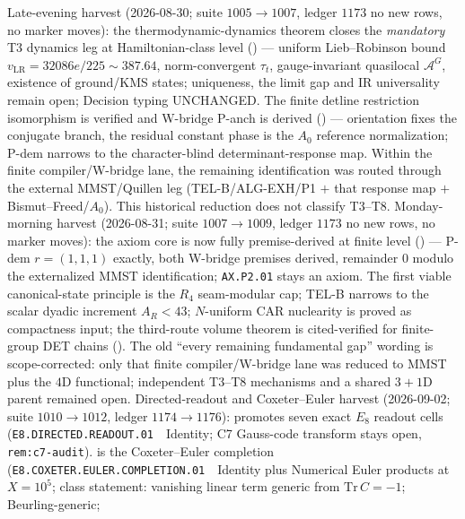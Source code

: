 \begin{keybox}
Late-evening harvest (2026-08-30; suite $1005\to1007$, ledger $1173$ no new rows, no marker moves):
the thermodynamic-dynamics theorem closes the \emph{mandatory} T3 dynamics leg at
Hamiltonian-class level
() ---
uniform Lieb--Robinson bound $v_{\mathrm{LR}}=32086e/225\sim387.64$, norm-convergent $\tau_t$,
gauge-invariant quasilocal $\mathcal A^G$, existence of ground/KMS states; uniqueness, the
limit gap and IR universality remain open; Decision typing UNCHANGED.
The finite detline restriction isomorphism is verified and W-bridge P-anch is derived
() ---
orientation fixes the conjugate branch, the residual constant phase is the $A_0$
reference normalization; P-dem narrows to the character-blind determinant-response map.
Within the finite compiler/W-bridge lane, the remaining identification was routed through
the external MMST/Quillen leg (TEL-B/ALG-EXH/P1 $+$ that response map $+$
Bismut--Freed/$A_0$).  This historical reduction does not classify T3--T8.
Monday-morning harvest (2026-08-31; suite $1007\to1009$, ledger $1173$ no new rows, no marker moves):
the axiom core is now fully premise-derived at finite level
() ---
P-dem $r=(1,1,1)$ exactly, both W-bridge premises derived, remainder $0$ modulo the
externalized MMST identification; \texttt{AX.P2.01} stays an axiom.
The first viable canonical-state principle is the $R_4$ seam-modular cap; TEL-B narrows
to the scalar dyadic increment $A_R<43$; $N$-uniform CAR nuclearity is proved as compactness
input; the third-route volume theorem is cited-verified for finite-group DET chains
().
The old ``every remaining fundamental gap'' wording is scope-corrected: only that finite
compiler/W-bridge lane was reduced to MMST plus the $4$D functional; independent T3--T8
mechanisms and a shared $3{+}1$D parent remained open.
Directed-readout and Coxeter--Euler harvest (2026-09-02; suite $1010\to1012$, ledger $1174\to1176$):
promotes seven exact $E_8$ readout cells (\texttt{E8.DIRECTED.READOUT.01}~\mE\ Identity;
C7 Gauss-code transform stays open, \texttt{rem:c7-audit}).
is the Coxeter--Euler completion (\texttt{E8.COXETER.EULER.COMPLETION.01}~\mE\ Identity plus Numerical Euler products at $X=10^5$;
class statement: vanishing linear term generic from $\mathrm{Tr}\,C=-1$; Beurling-generic;

\end{keybox}
